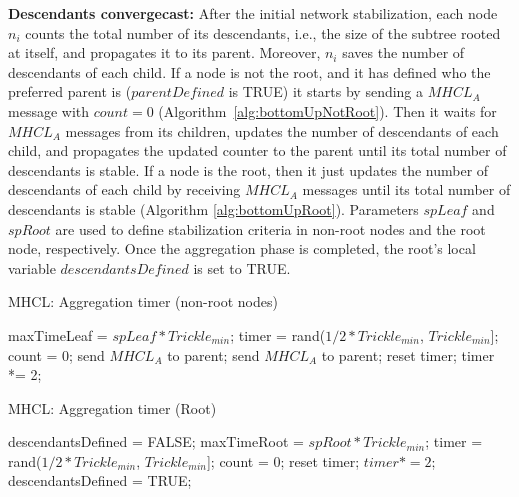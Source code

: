 \textbf{Descendants convergecast:} After the initial network stabilization, each node $n_i$ counts the total number of its descendants, i.e., the size of the subtree rooted at itself, and propagates it to its parent. Moreover, $n_i$ saves the number of descendants of each child. If a node is not the root, and it has defined who the preferred parent is ($parentDefined$ is TRUE) it starts by sending a $MHCL_{A}$ message with $count=0$ (Algorithm~\ref{alg:bottomUpNotRoot}). Then it waits for $MHCL_{A}$ messages from its children, updates the number of descendants of each child, and propagates the updated counter to the parent until its total number of descendants is stable. If a node is the root, then it just updates the number of descendants of each child by receiving  $MHCL_{A}$ messages until its total number of descendants is stable (Algorithm \ref{alg:bottomUpRoot}). Parameters $spLeaf$ and $spRoot$ are used to define stabilization criteria in non-root nodes and the root node, respectively. Once the aggregation phase is completed, the root's local variable $descendantsDefined$ is set to TRUE.

\begin{algorithm}[h!]
\caption{MHCL: Aggregation
timer (non-root nodes)}\label{alg:bottomUpNotRoot} 
\begin{algorithmic}[1]
  \State maxTimeLeaf = $spLeaf*Trickle_{min}$; 
  \State timer = rand($1/2 * Trickle_{min}$, $Trickle_{min}$]; 
  \State count = 0; 
\State {}
			\State send $MHCL_{A}$ to parent; 
		\EndIf
			\State send $MHCL_{A}$ to parent; 
			\State reset timer;		
		\Else	{} %
					\State timer *= 2;
				\EndIf
		\EndIf
\EndIf
\EndWhile
\end{algorithmic}
\end{algorithm}

\begin{algorithm}[h!]
\caption{MHCL: Aggregation timer (Root)}\label{alg:bottomUpRoot}
\begin{algorithmic}[1]
  \State descendantsDefined = FALSE;	
  \State maxTimeRoot = $spRoot *Trickle_{min}$; 
  \State timer = rand($1/2 * Trickle_{min}$, $Trickle_{min}$]; 
  \State count = 0; 
			\State reset timer;
		\Else
				\State $timer *= 2$;
			\Else
				\State descendantsDefined = TRUE;
			\EndIf
		\EndIf
\EndIf
\EndWhile
\end{algorithmic}
\end{algorithm}

